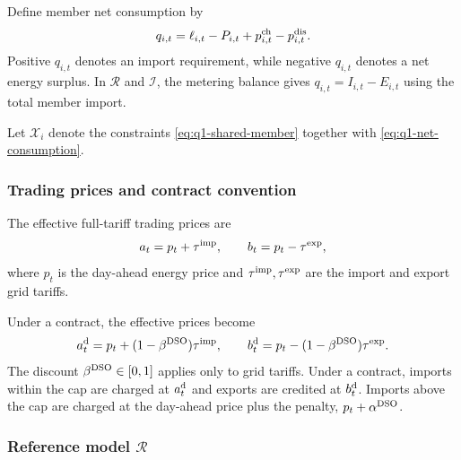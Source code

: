 Define member net consumption by
\begin{equation}
q_{i,t}
=\ell_{i,t}-P_{i,t}
+p^{\rm ch}_{i,t}-p^{\rm dis}_{i,t}.
\label{eq:q1-net-consumption}
\end{equation}
Positive $q_{i,t}$ denotes an import requirement,
while negative $q_{i,t}$ denotes a net energy surplus.
In $\mathcal R$ and $\mathcal I$, the metering balance gives
$q_{i,t}=I_{i,t}-E_{i,t}$ using the total member import.

Let $\mathcal X_i$ denote the constraints
\eqref{eq:q1-shared-member} together with
\eqref{eq:q1-net-consumption}.


\subsubsection{Trading prices and contract convention}

The effective full-tariff trading prices are
\begin{equation}
a_t=p_t+\tau^{\rm imp},
\qquad
b_t=p_t-\tau^{\rm exp},
\label{eq:q1-full-prices}
\end{equation}
where $p_t$ is the day-ahead energy price and
$\tau^{\rm imp},\tau^{\rm exp}$ are the import
and export grid tariffs.

Under a contract, the effective prices become
\begin{equation}
a_t^{\rm d}
=p_t+(1-\beta^{\rm DSO})\tau^{\rm imp},
\qquad
b_t^{\rm d}
=p_t-(1-\beta^{\rm DSO})\tau^{\rm exp}.
\label{eq:q1-discounted-prices}
\end{equation}
The discount $\beta^{\rm DSO}\in[0,1]$ applies
only to grid tariffs.
Under a contract, imports within the cap are charged at $a_t^{\rm d}$
and exports are credited at $b_t^{\rm d}$.
Imports above the cap are charged at the day-ahead price plus
the penalty, $p_t+\alpha^{\rm DSO}$.

\par
\endgroup

\subsubsection{Reference model $\mathcal R$}

